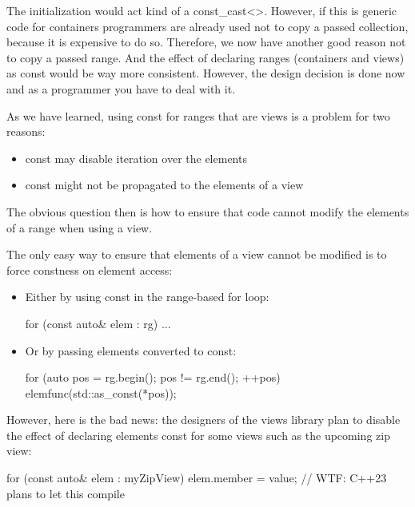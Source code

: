 The initialization would act kind of a const\_cast<>. However, if this is generic code for containers programmers are already used not to copy a passed collection, because it is expensive to do so. Therefore, we now have another good reason not to copy a passed range. And the effect of declaring ranges (containers and views) as const would be way more consistent. However, the design decision is done now and as a programmer you have to deal with it.


As we have learned, using const for ranges that are views is a problem for two reasons:

\begin{itemize}
\item
const may disable iteration over the elements

\item
const might not be propagated to the elements of a view
\end{itemize}

The obvious question then is how to ensure that code cannot modify the elements of a range when using a view.


The only easy way to ensure that elements of a view cannot be modified is to force constness on element access:

\begin{itemize}
\item
Either by using const in the range-based for loop:

\begin{cpp}
for (const auto& elem : rg) {
	...
}
\end{cpp}

\item
Or by passing elements converted to const:

\begin{cpp}
for (auto pos = rg.begin(); pos != rg.end(); ++pos) {
	elemfunc(std::as_const(*pos));
}
\end{cpp}
\end{itemize}

However, here is the bad news: the designers of the views library plan to disable the effect of declaring elements const for some views such as the upcoming zip view:

\begin{cpp}
for (const auto& elem : myZipView) {
	elem.member = value; // WTF: C++23 plans to let this compile
}
\end{cpp}

